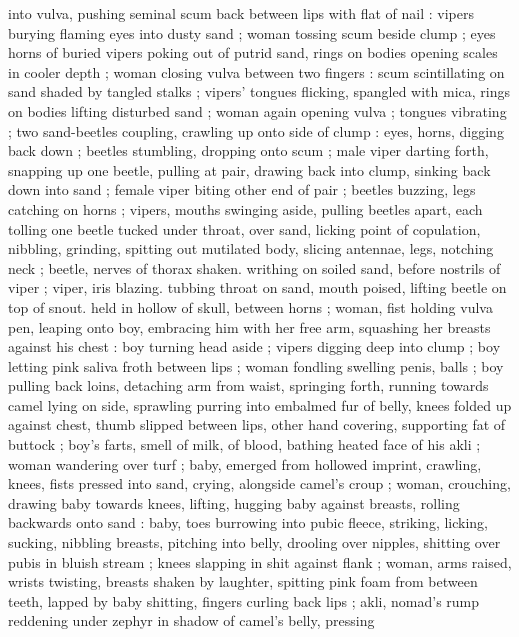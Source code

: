 {into vulva, pushing seminal scum back between lips with flat of nail : 
vipers burying flaming eyes into dusty sand ; woman tossing scum 
beside clump ; eyes horns of buried vipers poking out of putrid 
sand, rings on bodies opening scales in cooler depth ; woman closing 
vulva between two fingers : scum scintillating on sand shaded by 
tangled stalks ; vipers' tongues flicking, spangled with mica, rings on 
bodies lifting disturbed sand ; woman again opening vulva ; tongues 
vibrating ; two sand-beetles coupling, crawling up onto side of clump 
: eyes, horns, digging back down ; beetles stumbling, dropping onto 
scum ; male viper darting forth, snapping up one beetle, pulling at 
pair, drawing back into clump, sinking back down into sand ; female 
viper biting other end of pair ; beetles buzzing, legs catching on 
horns ; vipers, mouths swinging aside, pulling beetles apart, each 
tolling one beetle tucked under throat, over sand, licking point of 
copulation, nibbling, grinding, spitting out mutilated body, slicing 
antennae, legs, notching neck ; beetle, nerves of thorax shaken. 
writhing on soiled sand, before nostrils of viper ; viper, iris blazing. 
tubbing throat on sand, mouth poised, lifting beetle on top of snout. 
held in hollow of skull, between horns ; woman, fist holding vulva 
pen, leaping onto boy, embracing him with her free arm, squashing 
her breasts against his chest : boy turning head aside ; vipers 
digging deep into clump ; boy letting pink saliva froth between lips ; 
woman fondling swelling penis, balls ; boy pulling back loins, 
detaching arm from waist, springing forth, running towards camel 
lying on side, sprawling purring into embalmed fur of belly, knees 
folded up against chest, thumb slipped between lips, other hand 
covering, supporting fat of buttock ; boy's farts, smell of milk, of 
blood, bathing heated face of his akli ; woman wandering over turf ; 
baby, emerged from hollowed imprint, crawling, knees, fists pressed 
into sand, crying, alongside camel's croup ; woman, crouching, 
drawing baby towards knees, lifting, hugging baby against breasts, 
rolling backwards onto sand : baby, toes burrowing into pubic fleece, 
striking, licking, sucking, nibbling breasts, pitching into belly, 
drooling over nipples, shitting over pubis in bluish stream ; knees 
slapping in shit against flank ; woman, arms raised, wrists twisting, 
breasts shaken by laughter, spitting pink foam from between teeth, 
lapped by baby shitting, fingers curling back lips ; akli, nomad's 
rump reddening under zephyr in shadow of camel's belly, pressing 
}

